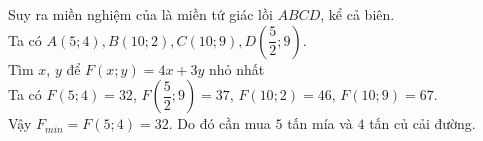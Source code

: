 \begin{bt}
{\begin{enumerate}
{\begin{tikzpicture}[>=stealth,line join=round,line cap=round,font=\footnotesize,scale=.65]
					\end{tikzpicture}}
				Suy ra miền nghiệm của là miền tứ giác lồi $ABCD$, kể cả biên.\\
				Ta có $A(5 ; 4),B(10 ; 2), C(10 ; 9), D\left(\dfrac{5}{2} ; 9\right)$.\\
					Tìm $x$, $y$ để $F\left(x;y\right)=4x+3y$ nhỏ nhất\\
					Ta có $F\left(5;4\right)=32$, $F\left(\dfrac{5}{2};9\right)=37$, $F\left(10;2\right)=46$, $F\left(10;9\right)=67$.\\
					Vậy $F_{min}=F\left(5;4\right)=32$. Do đó cần mua $5$ tấn mía và $4$ tấn củ cải đường.	
			\end{enumerate}
		}
	\end{bt}
	







